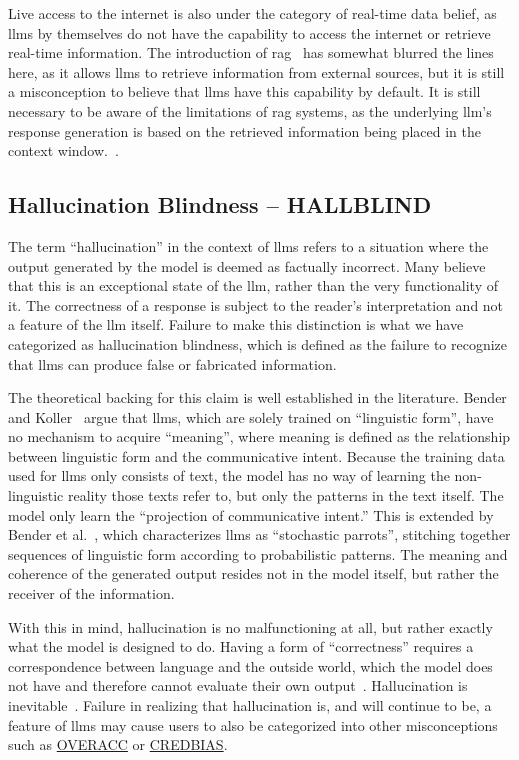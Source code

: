 Live access to the internet is also under the category of real-time data belief, as \gls{llms} by themselves do not have the capability to access the internet or retrieve real-time information. The introduction of \gls{rag}~\cite{lewis_retrieval-augmented_2020} has somewhat blurred the lines here, as it allows \gls{llms} to retrieve information from external sources, but it is still a misconception to believe that \gls{llms} have this capability by default. It is still necessary to be aware of the limitations of \gls{rag} systems, as the underlying \gls{llm}'s response generation is based on the retrieved information being placed in the context window.~\cite{williams_why_2024}.

\subsection{Hallucination Blindness -- HALLBLIND}\label{hallblind}
The term ``hallucination'' in the context of \gls{llms} refers to a situation where the output generated by the model is deemed as factually incorrect. Many believe that this is an exceptional state of the \gls{llm}, rather than the very functionality of it. The correctness of a response is subject to the reader's interpretation and not a feature of the \gls{llm} itself.
Failure to make this distinction is what we have categorized as hallucination blindness, which is defined as the failure to recognize that \gls{llms} can produce false or fabricated information.

The theoretical backing for this claim is well established in the literature. Bender and Koller~\cite{bender_climbing_2020} argue that \gls{llms}, which are solely trained on ``linguistic form'', have no mechanism to acquire ``meaning'', where meaning is defined as the relationship between linguistic form and the communicative intent.
Because the training data used for \gls{llms} only consists of text, the model has no way of learning the non-linguistic reality those texts refer to, but only the patterns in the text itself. The model only learn the ``projection of communicative intent.''
This is extended by Bender et al.~\cite{bender_dangers_2021}, which characterizes \gls{llms} as ``stochastic parrots'', stitching together sequences of linguistic form according to probabilistic patterns. The meaning and coherence of the generated output resides not in the model itself, but rather the receiver of the information.

With this in mind, hallucination is no malfunctioning at all, but rather exactly what the model is designed to do. Having a form of ``correctness'' requires a correspondence between language and the outside world, which the model does not have and therefore cannot evaluate their own output~\cite{bender_climbing_2020}. Hallucination is inevitable~\cite{ghaseminejad_raeini_evolution_2025}.
Failure in realizing that hallucination is, and will continue to be, a feature of \gls{llms} may cause users to also be categorized into other misconceptions such as \hyperref[overacc]{OVERACC} or \hyperref[credbias]{CREDBIAS}. 

